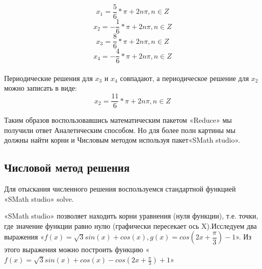 \documentclass[russian,utf8,nocolumnxxxi,nocolumnxxxii]{eskdtext}
\begin{document}
$$x_1=\frac{5}{6}*\pi+2n\pi,n\in Z$$
$$x_2=-\frac{1}{6}*\pi+2n\pi,n\in Z$$
$$x_3=\frac{8}{6}*\pi+2n\pi,n\in Z$$
$$x_4=-\frac{4}{6}*\pi+2n\pi,n\in Z$$\\

Периодические решения для $x_3$ и $x_4$ совпадают, а периодическое решение для $x_2$ можно записать в виде:
$$x_2=\frac{11}{6}*\pi+2n\pi,n\in Z$$

Таким образов воспользовавшись математическим пакетом «Reduce» мы получили ответ Аналетическим способом. Но для более полн	 картины мы должны найти корни и Числовым методом используя пакет«SMath studio».

\subsection{Числовой метод решения} \label{resh}

Для отыскания численного решения воспользуемся стандартной функцией «SMath studio» solve.

«SMath studio» позволяет находить корни уравнения (нуля функции), т.е. точки, где значение функции равно нулю (графически пересекает ось X).Исследуем два выражения «$f(x)=\sqrt{3}sin(x)+cos(x),g(x)=cos(2x+\dfrac{\pi}{3})-1$». Из этого выражения можно построить функцию «$f(x)=\sqrt3 sin(x)+cos(x)-cos(2x+\frac{\pi}{3})+1$» 



\end{document}
